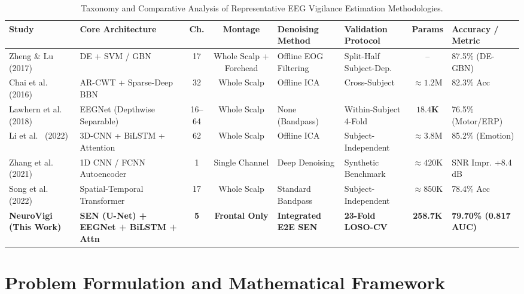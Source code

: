 \documentclass[conference]{IEEEtran}
\begin{document}
\begin{table}[t]
\caption{Taxonomy and Comparative Analysis of Representative EEG Vigilance Estimation Methodologies.}
\label{tab:lit_comparison}
\centering
\scriptsize
\setlength{\tabcolsep}{3pt}
\begin{tabular}{@{}p{2.6cm}p{3.5cm}ccp{2.0cm}p{2.4cm}cp{2.2cm}@{}}
\toprule
\textbf{Study} & \textbf{Core Architecture} & \textbf{Ch.} & \textbf{Montage} & \textbf{Denoising Method} & \textbf{Validation Protocol} & \textbf{Params} & \textbf{Accuracy / Metric} \\
\midrule
Zheng \& Lu~\cite{zheng2017seedvig} (2017) & DE + SVM / GBN & 17 & Whole Scalp + Forehead & Offline EOG Filtering & Split-Half Subject-Dep. & -- & 87.5\% (DE-GBN) \\
Chai et al.~\cite{chai2016driver} (2016) & AR-CWT + Sparse-Deep BBN & 32 & Whole Scalp & Offline ICA & Cross-Subject & $\approx 1.2\text{M}$ & 82.3\% Acc \\
Lawhern et al.~\cite{lawhern2018eegnet} (2018) & EEGNet (Depthwise Separable) & 16--64 & Whole Scalp & None (Bandpass) & Within-Subject 4-Fold & $\mathbf{18.4\text{K}}$ & 76.5\% (Motor/ERP) \\
Li et al.~\cite{li2022spatiotemporal} (2022) & 3D-CNN + BiLSTM + Attention & 62 & Whole Scalp & Offline ICA & Subject-Independent & $\approx 3.8\text{M}$ & 85.2\% (Emotion) \\
Zhang et al.~\cite{zhang2021eegdenoisenet} (2021) & 1D CNN / FCNN Autoencoder & 1 & Single Channel & Deep Denoising & Synthetic Benchmark & $\approx 420\text{K}$ & SNR Impr. +8.4\,dB \\
Song et al.~\cite{song2022transformer} (2022) & Spatial-Temporal Transformer & 17 & Whole Scalp & Standard Bandpass & Subject-Independent & $\approx 850\text{K}$ & 78.4\% Acc \\
\midrule
\textbf{NeuroVigi (This Work)} & \textbf{SEN (U-Net) + EEGNet + BiLSTM + Attn} & \textbf{5} & \textbf{Frontal Only} & \textbf{Integrated E2E SEN} & \textbf{23-Fold LOSO-CV} & \textbf{258.7K} & \textbf{79.70\% (0.817 AUC)} \\
\bottomrule
\end{tabular}
\end{table}

\section{Problem Formulation and Mathematical Framework}
\label{sec:formulation}
\end{document}
